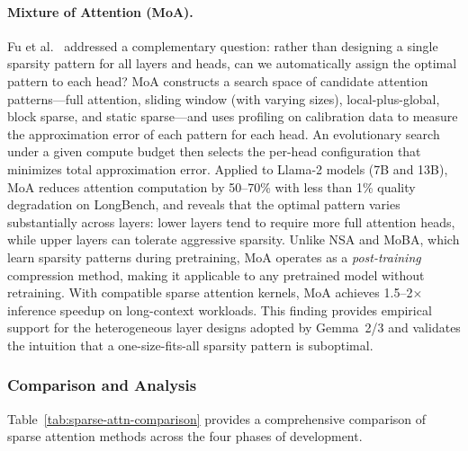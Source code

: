 \paragraph{Mixture of Attention (MoA).}
Fu et al.~\cite{fu2024moa} addressed a complementary question: rather than designing a single sparsity pattern for all layers and heads, can we automatically assign the optimal pattern to each head? MoA constructs a search space of candidate attention patterns---full attention, sliding window (with varying sizes), local-plus-global, block sparse, and static sparse---and uses profiling on calibration data to measure the approximation error of each pattern for each head. An evolutionary search under a given compute budget then selects the per-head configuration that minimizes total approximation error. Applied to Llama-2 models (7B and 13B), MoA reduces attention computation by 50--70\% with less than 1\% quality degradation on LongBench, and reveals that the optimal pattern varies substantially across layers: lower layers tend to require more full attention heads, while upper layers can tolerate aggressive sparsity. Unlike NSA and MoBA, which learn sparsity patterns during pretraining, MoA operates as a \emph{post-training} compression method, making it applicable to any pretrained model without retraining. With compatible sparse attention kernels, MoA achieves 1.5--2$\times$ inference speedup on long-context workloads. This finding provides empirical support for the heterogeneous layer designs adopted by Gemma~2/3 and validates the intuition that a one-size-fits-all sparsity pattern is suboptimal.


\subsubsection{Comparison and Analysis}
\label{subsubsec:sparse-comparison}

Table~\ref{tab:sparse-attn-comparison} provides a comprehensive comparison of sparse attention methods across the four phases of development.

